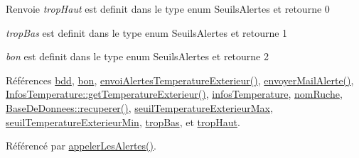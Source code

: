 \begin{DoxyReturn}{Renvoie}
{\itshape trop\+Haut} est definit dans le type enum Seuils\+Alertes et retourne 0 

{\itshape trop\+Bas} est definit dans le type enum Seuils\+Alertes et retourne 1 

{\itshape bon} est definit dans le type enum Seuils\+Alertes et retourne 2 
\end{DoxyReturn}


Références \hyperlink{class_alertes_a91e58b69d29922e8e984efb767ae5268}{bdd}, \hyperlink{parametres_8h_aaa6de8207c94675264c90b10b613368da5ac8ec3b54d90a07c6bb5a77ef971821}{bon}, \hyperlink{class_alertes_a7b257375a0d8ad5f41abaa572799aae4}{envoi\+Alertes\+Temperature\+Exterieur()}, \hyperlink{class_alertes_a375783502a78109f3323dc1ed90cfdc9}{envoyer\+Mail\+Alerte()}, \hyperlink{class_infos_temperature_aebb00308151b8b6319732b62bd7b4b55}{Infos\+Temperature\+::get\+Temperature\+Exterieur()}, \hyperlink{class_alertes_ad02b203545812ad6408befecc94ee0ec}{infos\+Temperature}, \hyperlink{class_alertes_a212f2a7185bcc7b11f3e54200272bdcf}{nom\+Ruche}, \hyperlink{class_base_de_donnees_a77539baad389f5acf754cd2cd452403e}{Base\+De\+Donnees\+::recuperer()}, \hyperlink{class_alertes_a207e0266c68ad378dae846382ba9f9dc}{seuil\+Temperature\+Exterieur\+Max}, \hyperlink{class_alertes_a0898c501edf5f07ac503b31b8a3d2454}{seuil\+Temperature\+Exterieur\+Min}, \hyperlink{parametres_8h_aaa6de8207c94675264c90b10b613368da4257e2f8921856770c8266f55c937295}{trop\+Bas}, et \hyperlink{parametres_8h_aaa6de8207c94675264c90b10b613368dabc650d9700ae19f2696e6a6e3f9ab067}{trop\+Haut}.



Référencé par \hyperlink{class_alertes_ad04a02dcc6e6f14da0784c7054888b05}{appeler\+Les\+Alertes()}.


